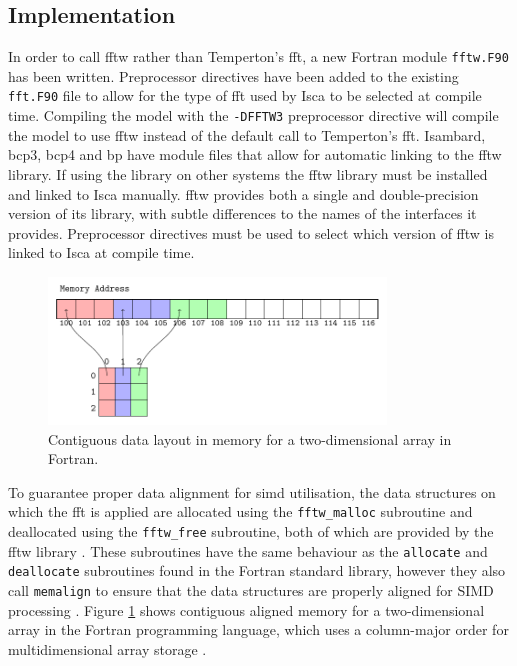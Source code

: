 \documentclass[a4paper,11pt]{report}
\begin{document}
\subsection{Implementation}
In order to call \gls{fftw} rather than Temperton's \gls{fft}, a new Fortran module \texttt{fftw.F90} has been written. Preprocessor directives have been added to the existing \texttt{fft.F90} file to allow for the type of \gls{fft} used by Isca to be selected at compile time. Compiling the model with the \texttt{-DFFTW3} preprocessor directive will compile the model to use \gls{fftw} instead of the default call to Temperton's \gls{fft}. Isambard, \gls{bcp3}, \gls{bcp4} and \gls{bp} have module files that allow for automatic linking to the \gls{fftw} library. If using the library on other systems the \gls{fftw} library must be installed and linked to Isca manually. \gls{fftw} provides both a single and double-precision version of its library, with subtle differences to the names of the interfaces it provides. Preprocessor directives must be used to select which version of \gls{fftw} is linked to Isca at compile time. 
\par
\begin{figure}[htbp]
\begin{center}
\includegraphics[width=0.8\textwidth]{img/tikz-img/data_layout/data_layout.pdf}
\caption[Two-dimensional data layout in Fortran]{Contiguous data layout in memory for a two-dimensional array in Fortran.}
\label{fig:memalign}
\end{center}
\end{figure}
\par
To guarantee proper data alignment for \gls{simd} utilisation, the data structures on which the \gls{fft} is applied are allocated using the \texttt{fftw\_malloc} subroutine and deallocated using the \texttt{fftw\_free} subroutine, both of which are provided by the \gls{fftw} library \cite{frigo2005design}. These subroutines have the same behaviour as the \texttt{allocate} and \texttt{deallocate} subroutines found in the Fortran standard library, however they also call \texttt{memalign} to ensure that the data structures are properly aligned for SIMD processing \cite{frigo2003fftw}. Figure \ref{fig:memalign} shows contiguous aligned memory for a two-dimensional array in the Fortran programming language, which uses a column-major order for multidimensional array storage \cite{lahey1994fortran}.
\end{document}
